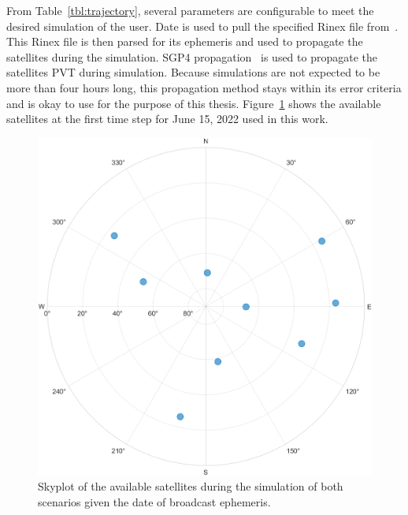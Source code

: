From Table~\ref{tbl:trajectory}, several parameters are configurable to meet the desired simulation of the user. Date is used to pull the specified Rinex file from~\cite{CDDIS}. This Rinex file is then parsed for its ephemeris and used to propagate the satellites during the simulation. SGP4 propagation~\cite{} is used to propagate the satellites PVT during simulation. Because simulations are not expected to be more than four hours long, this propagation method stays within its error criteria and is okay to use for the purpose of this thesis. Figure~\ref{fig:skyplot} shows the available satellites at the first time step for June 15, 2022 used in this work.

\begin{figure}[!ht]
    \centering
    \includegraphics[width=0.4\linewidth]{Figures/Results/skyplot.png}
    \caption{Skyplot of the available satellites during the simulation of both scenarios given the date of broadcast ephemeris.}\label{fig:skyplot}
\end{figure}

